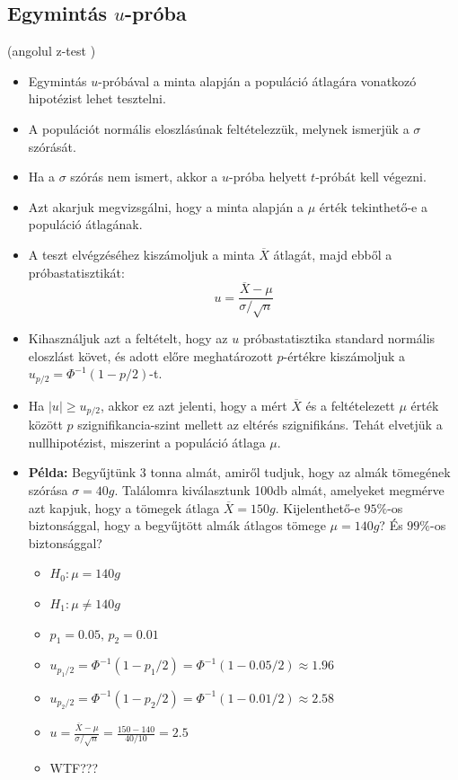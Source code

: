 \documentclass[12pt]{article}
\theoremstyle{plain}
\begin{document}
\subsection{Egymintás $u$-próba \cite{uprobawiki}}(angolul z-test \cite{ztestwiki})
\begin{itemize}
    \item Egymintás $u$-próbával a minta alapján a populáció átlagára vonatkozó hipotézist lehet tesztelni.
    \item A populációt normális eloszlásúnak feltételezzük, melynek ismerjük a $\sigma$ szórását.
    \item Ha a $\sigma$ szórás nem ismert, akkor a $u$-próba helyett $t$-próbát kell végezni.
    \item Azt akarjuk megvizsgálni, hogy a minta alapján a $\mu$ érték tekinthető-e a populáció átlagának.
    \item A teszt elvégzéséhez kiszámoljuk a minta $\overline{X}$ átlagát, majd ebből a próbastatisztikát:
        \begin{equation*}
            u = \frac{\overline{X}-\mu}{\sigma/\sqrt{n}}
        \end{equation*}
    \item Kihasználjuk azt a feltételt, hogy az $u$ próbastatisztika standard normális eloszlást követ, és adott előre
    meghatározott $p$-értékre kiszámoljuk a $u_{p/2} = \Phi^{-1}(1-p/2)$-t. 
    \item Ha $|u| \geq u_{p/2}$, akkor ez azt jelenti, hogy a mért $\overline{X}$ és a feltételezett $\mu$ érték között
    $p$ szignifikancia-szint mellett az eltérés szignifikáns. Tehát elvetjük a nullhipotézist, miszerint a populáció átlaga $\mu$.

    \item \textbf{Példa:} Begyűjtünk 3 tonna almát, amiről tudjuk, hogy az almák tömegének szórása $\sigma=40g$.
    Találomra kiválasztunk 100db almát, amelyeket megmérve azt kapjuk, hogy a tömegek átlaga $\overline{X}=150g$.
    Kijelenthető-e $95\%$-os biztonsággal, hogy a begyűjtött almák átlagos tömege $\mu=140g$? És $99\%$-os 
    biztonsággal?
    \begin{itemize}
        \item $H_0: \mu = 140g$
        \item $H_1: \mu \neq 140g$
        \item $p_1=0.05,\,p_2=0.01$
        \item $u_{p_1/2} = \Phi^{-1}(1-p_1/2) = \Phi^{-1}(1-0.05/2) \approx 1.96$
        \item $u_{p_2/2} = \Phi^{-1}(1-p_2/2) = \Phi^{-1}(1-0.01/2) \approx 2.58$
        \item $u = {\displaystyle\frac{\overline{X}-\mu}{\sigma/\sqrt{n}}} = {\displaystyle \frac{150-140}{40/10}} = 2.5$
        \item WTF???
    \end{itemize}
\end{itemize}
\end{document}
